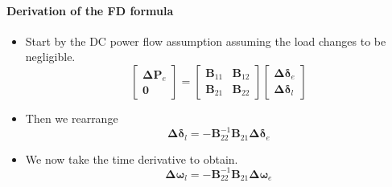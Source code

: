 \begin{frame}{\secname}
	\framesubtitle{Derivation of the FD formula}
	\begin{itemize}
		\item Start by the DC power flow assumption assuming the load changes to be negligible.
		\begin{equation}
			\begin{bmatrix}
				\boldsymbol{\Delta P}_{e} \\ \boldsymbol{0}
			\end{bmatrix}
			=
			\begin{bmatrix}
				\boldsymbol{B}_{11} & \boldsymbol{B}_{12} \\
				\boldsymbol{B}_{21} & \boldsymbol{B}_{22}
			\end{bmatrix}
			\begin{bmatrix}
				\boldsymbol{\Delta \delta}_e \\
				\boldsymbol{\Delta \delta}_l
			\end{bmatrix}
		\end{equation}
		\item Then we rearrange
		\begin{equation}\label{eq:theta_l}
			\boldsymbol{\Delta \delta}_l = -\boldsymbol{B}_{22}^{-1}\boldsymbol{B}_{21}\boldsymbol{\Delta \delta}_e
		\end{equation}
		\item We now take the time derivative to obtain.
		\begin{equation}\label{eq:theta_l}
			\boldsymbol{\Delta \omega}_l = -\boldsymbol{B}_{22}^{-1}\boldsymbol{B}_{21}\boldsymbol{\Delta \omega}_e
		\end{equation}
	\end{itemize}
\end{frame}
